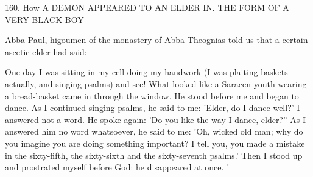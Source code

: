 160.
How A DEMON APPEARED TO AN ELDER IN.
THE FORM OF A VERY BLACK BOY

Abba Paul, higoumen of the monastery of Abba Theognias told us
that a certain ascetic elder had said:

One day I was sitting in my cell doing my handwork (I was plaiting
baskets actually, and singing psalms) and see! What looked like a
Saracen youth wearing a bread-basket came in through the window.
He stood before me and began to dance.
As I continued singing
psalms, he said to me: 'Elder, do I dance well?' I answered not a
word.
He spoke again: 'Do you like the way I dance, elder?” As I
answered him no word whatsoever, he said to me: 'Oh, wicked old
man; why do you imagine you are doing something important? I tell
you, you made a mistake in the sixty-fifth, the sixty-sixth and the
sixty-seventh psalms.' Then I stood up and prostrated myself before
God: he disappeared at once.
᾿

